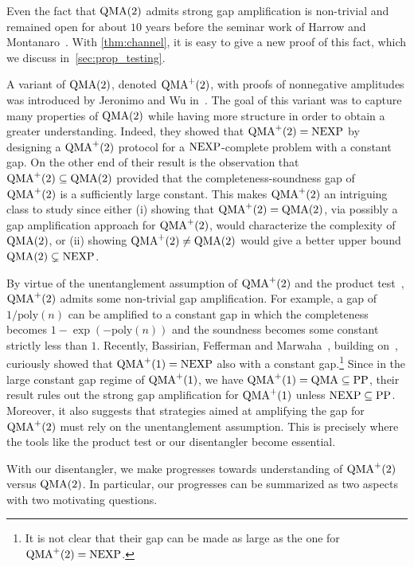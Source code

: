 \documentclass[10pt,a4paper]{article}
\theoremstyle{remark}
\newcommand{\poly}{{\mathrm{poly}}}
\newcommand{\1}[1]{\mathds{1}{[#1]}}
\newcommand{\QMA}{\textup{QMA}}
\newcommand{\NEXP}{\textup{NEXP}}
\numberwithin{equation}{section}
\begin{document}
Even the fact that $\QMA(2)$ admits strong gap amplification is non-trivial and remained open for
about $10$ years before the seminar work of Harrow and Montanaro~\cite{HM13}.
%
With \cref{thm:channel}, it is easy to give a new proof of this fact, which we discuss
in~\cref{sec:prop_testing}. 

A variant of $\QMA(2)$, denoted $\QMA^+(2)$, with proofs of nonnegative amplitudes
was introduced by Jeronimo and Wu in~\cite{JW23}.
%
The goal of this variant was to capture many properties of $\QMA(2)$ while having more
structure in order to obtain a greater understanding.
%
Indeed, they showed that $\QMA^+(2)=\NEXP$ by designing a $\QMA^+(2)$ protocol for a $\NEXP$-complete problem with a constant gap.
%
On the other end of their result is the observation that $\QMA^+(2)\subseteq\QMA(2)$
provided that the completeness-soundness gap of $\QMA^+(2)$ is a sufficiently large constant.
%
This makes $\QMA^+(2)$ an intriguing class to study since either (i) showing that $\QMA^+(2)=\QMA(2)$, via possibly a gap amplification approach for $\QMA^+(2)$,
would characterize the complexity of $\QMA(2)$, or (ii) showing $\QMA^+(2) \ne \QMA(2)$ would
give a better upper bound $\QMA(2) \subsetneq \NEXP$.
%

By virtue of the unentanglement assumption of $\QMA^+(2)$ and the product test~\cite{HM13},
$\QMA^+(2)$ admits some non-trivial gap amplification.
%
For example, a gap of $1/\poly(n)$ can be amplified to a constant gap in which the completeness
becomes $1-\exp(-\poly(n))$ and the soundness becomes some constant strictly less than $1$.
%
Recently, Bassirian, Fefferman and Marwaha~\cite{bassirian2023quantum}, building on~\cite{JW23},
curiously showed that $\QMA^+(1)=\NEXP$ also with a constant gap.\footnote{It is not clear that
their gap can be made as large as the one for $\QMA^+(2)=\NEXP$.}
%
Since in the large constant gap regime of $\QMA^+(1)$, we have $\QMA^+(1)=\QMA \subseteq \textup{PP}$,
their result rules out the strong gap amplification for $\QMA^+(1)$ unless $\NEXP\subseteq\textup{PP}$.
%
Moreover, it also suggests that strategies aimed at amplifying the gap for $\QMA^+(2)$ must rely on
the unentanglement assumption.
%
This is precisely where the tools like the product test or our disentangler become essential.

With our disentangler, we make progresses towards understanding of $\QMA^+(2)$ versus $\QMA(2)$.
%
In particular, our progresses can be summarized as two aspects with two motivating questions.
\end{document}
